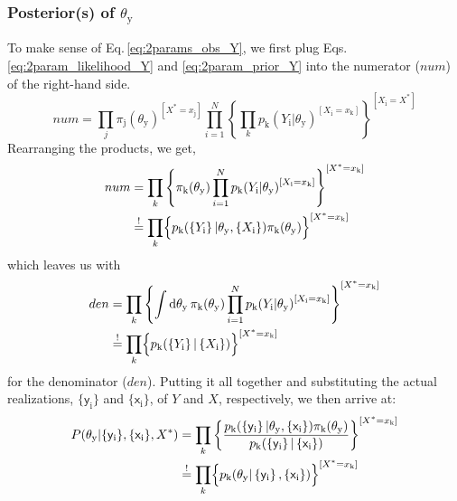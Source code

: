 \documentclass[]{report}
\begin{document}
\subsubsection{Posterior(s) of $\theta_\mathrm{y}$}
To make sense of Eq.\,\ref{eq:2params_obs_Y}, we first plug Eqs.\,\ref{eq:2param_likelihood_Y} and \ref{eq:2param_prior_Y} into the numerator ($num$) of the right-hand side.
\begin{equation}
num 
=
\prod_{j}
	{
		\pi_\mathrm{j}( \theta_\mathrm{y} )
	}^{
		[ X^* = x_\mathrm{j} ]
	}
\prod_{i=1}^{N}
	\left\{
		\prod_{k}
			{
				p_\mathrm{k}( Y_\mathrm{i} | \theta_\mathrm{y} )
			}^{
			[ X_\mathrm{i} = x_\mathrm{k} ]
		}
	\right\}^{
		[ X_\mathrm{i} = X^* ]
	}
\end{equation}
Rearranging the products, we get,
\begin{align}
num 
&=
\prod_{k}
	\left\{
		\pi_\mathrm{k}( \theta_\mathrm{y} )
		\prod_{i=1}^{N}
			{
				p_\mathrm{k}( Y_\mathrm{i} |\theta_\mathrm{y} )
			}^{
				[ X_\mathrm{i} = x_\mathrm{k} ]
			}
	\right\}^{
		[ X^* = x_\mathrm{k} ]
	}
\nonumber \\
&\stackrel{!}{=}
\prod_{k}
	\Bigl\{
		p_\mathrm{k}(
			\left\{ Y_\mathrm{i} \right\} |
			\theta_\mathrm{y},
			\left\{ X_\mathrm{i} \right\}
		)
		\pi_\mathrm{k}( \theta_\mathrm{y} )
	\Bigr\}^{
		[ X^* = x_\mathrm{k} ]
	}
\end{align}
which leaves us with
\begin{align}
den 
&= 
\prod_{k}
	\left\{
		\int \mathrm{d}\theta_\mathrm{y} \,
			\pi_\mathrm{k}( \theta_\mathrm{y} )
			\prod_{i=1}^{N}
				{
					p_\mathrm{k}( Y_\mathrm{i} | \theta_\mathrm{y} )
				}^{
					[ X_\mathrm{i} = x_\mathrm{k} ]
				}
	\right\}^{
		[ X^* = x_\mathrm{k} ]
	} 
\nonumber \\
&\stackrel{!}{=}
\prod_{k}
	\Bigl\{
		p_\mathrm{k}( \left\{ Y_\mathrm{i} \right\} | \left\{ X_\mathrm{i} \right\} )
	\Bigr\}^{
		[ X^* = x_\mathrm{k} ]
	}
\end{align}
for the denominator ($den$). Putting it all together and substituting the actual realizations, $ \{ \mathsf{y}_\mathrm{i} \} $ and $ \{ \mathsf{x}_\mathrm{i} \} $, of $Y$ and $X$, respectively, we then arrive at:
\begin{align}
P( \theta_\mathrm{y} | \{ \mathsf{y}_\mathrm{i} \}, \{ \mathsf{x}_\mathrm{i} \}, X^*) 
&=
\prod_{k}
	\left\{
		\frac
			{
				p_\mathrm{k}(
					\left\{ \mathsf{y}_\mathrm{i} \right\} |
					\theta_\mathrm{y}, 
					\left\{ \mathsf{x}_\mathrm{i} \right\}
				)
				\pi_\mathrm{k}( \theta_\mathrm{y} )
			}
			{
				p_\mathrm{k}(
					\left\{ \mathsf{y}_\mathrm{i} \right\} |
					\left\{ \mathsf{x}_\mathrm{i} \right\} )
			}
	\right\}^{
		[ X^* = x_\mathrm{k} ]
	}
\nonumber \\
&\stackrel{!}{=}
\prod_{k}
	\Bigl\{
		p_\mathrm{k}(
			\theta_\mathrm{y} |
			\left\{ \mathsf{y}_\mathrm{i} \right\},
			\left\{ \mathsf{x}_\mathrm{i} \right\}
		)
	\Bigr\}^{
		[ X^* = x_\mathrm{k} ]
	} 
\end{align}
\end{document}
